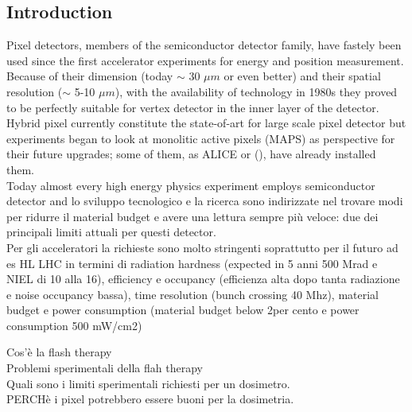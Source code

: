 \begin{titlepage}
\section{Introduction}
Pixel detectors, members of the semiconductor detector family, have fastely been used since the first 
accelerator experiments for energy and position measurement. 
Because of their dimension (today $\sim$ 30 $\mu m$ or even better) and their spatial resolution 
($\sim$ 5-10 $\mu m$), with the availability of technology in 1980s they proved to be perfectly suitable 
for vertex detector in the inner layer of the detector.\\
Hybrid pixel currently constitute the state-of-art for large scale pixel detector but experiments began to look at monolitic active pixels (MAPS) as perspective for their future upgrades; some of them, as ALICE or 
(), have already installed them. \\

Today almost every high energy physics experiment employs semiconductor detector and 
lo sviluppo tecnologico e la ricerca sono indirizzate nel trovare modi per ridurre il material budget e
avere una lettura sempre più veloce: due dei principali limiti attuali per questi detector. \\

Per gli acceleratori la richieste sono molto stringenti soprattutto per il futuro ad es HL LHC in termini di radiation hardness (expected in 5 anni 500 Mrad e NIEL di 10 alla 16), efficiency e occupancy (efficienza alta dopo tanta radiazione e noise occupancy bassa), time resolution (bunch crossing 40 Mhz), material budget e power consumption (material budget below 2per cento e power consumption 500 mW/cm2)

Cos'è la flash therapy\\
Problemi sperimentali della flah therapy\\
Quali sono i limiti sperimentali richiesti per un dosimetro.\\
PERCHè i pixel potrebbero essere buoni per la dosimetria.\\



\end{titlepage}
